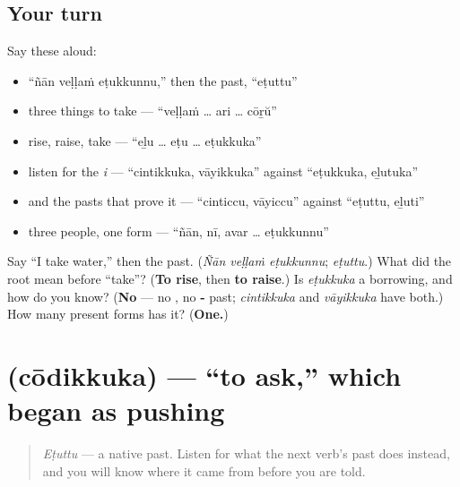 \subsection*{Your turn}
Say these aloud:

\begin{itemize}
\raggedright
  \item \textquotedblleft{}ñān veḷḷaṁ eṭukkunnu,\textquotedblright{} then the past, \textquotedblleft{}eṭuttu\textquotedblright{}
  \item three things to take — \textquotedblleft{}veḷḷaṁ … ari … cōṟŭ\textquotedblright{}
  \item rise, raise, take — \textquotedblleft{}eḻu … eṭu … eṭukkuka\textquotedblright{}
  \item listen for the \emph{i} — \textquotedblleft{}cintikkuka, vāyikkuka\textquotedblright{} against \textquotedblleft{}eṭukkuka, eḻutuka\textquotedblright{}
  \item and the pasts that prove it — \textquotedblleft{}cinticcu, vāyiccu\textquotedblright{} against \textquotedblleft{}eṭuttu, eḻuti\textquotedblright{}
  \item three people, one form — \textquotedblleft{}ñān, nī, avar … eṭukkunnu\textquotedblright{}
\end{itemize}

\begin{tcolorbox}[breakable,colback=teal!4,colframe=teal!35!black,title={Before you move on}]
Say \textquotedblleft{}I take water,\textquotedblright{} then the past. (\emph{Ñān veḷḷaṁ eṭukkunnu}; \emph{eṭuttu}.) What did the root mean before \textquotedblleft{}take\textquotedblright{}? (\textbf{To rise}, then \textbf{to raise}.) Is \emph{eṭukkuka} a borrowing, and how do you know? (\textbf{No} — no \textbf{}, no \textbf{‑} past; \emph{cintikkuka} and \emph{vāyikkuka} have both.) How many present forms has it? (\textbf{One.})
\end{tcolorbox}
\section[\texorpdfstring{\ml{ചോദിക്കുക} (cōdikkuka)}{ചോദിക്കുക (cōdikkuka)}]{ (cōdikkuka) — \textquotedblleft{}to ask,\textquotedblright{} which began as pushing}

\label{lesson:ML-C34-codikkuka}



\begin{quote}
\emph{Eṭuttu} — a native past. Listen for what the next verb's past does instead, and you will know where it came from before you are told.
\end{quote}

